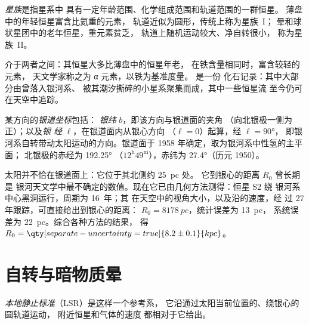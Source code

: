 \begin{definition}[星族]\label{def:b3:milky-way-galaxies:populations}
\emph{星族}是指星系中
具有一定年龄范围、化学组成范围和轨道范围的一群恒星。
薄盘中的年轻恒星富含比氦重的元素，
轨道近似为圆形，传统上称为星族~I；
晕和球状星团中的老年恒星，重元素贫乏，
轨道上随机运动较大、净自转很小，
称为星族~II。
\end{definition}

介于两者之间：其恒星大多比薄盘中的恒星年老，
在铁含量相同时，富含较轻的元素，
天文学家称之为 α 元素，以铁为基准度量。
是一份
化石记录：其中大部分由曾落入银河系、
被其潮汐撕碎的小星系聚集而成，其中一些恒星流
至今仍可在天空中追踪。

\begin{definition}[银道坐标]\label{def:b3:milky-way-galaxies:coordinates}
某方向的\emph{银道坐标}包括：
\emph{银纬} $b$，即该方向与银道面的夹角
（向北银极一侧为正）；以及\emph{银
经} $\ell$，在银道面内从银心方向
（$\ell = 0$）起算，经 $\ell = \ang{90}$，
即银河系自转带动太阳运动的方向。银道面于
1958 年确定，取为银河系中性氢的主平面；
北银极的赤经为 \ang{192.25}
（$12^\mathrm{h}49^\mathrm{m}$），赤纬为 \ang{27.4}（历元
1950）。
\end{definition}

太阳并不恰在银道面上：它位于其北侧约 \qty{25}{pc} 处。
它到银心的距离 $R_0$ 曾长期是
银河天文学中最不确定的数值。现在它已由几何方法测得：恒星 S2 绕
银河系中心黑洞运行，周期为 \num{16}~年；其
在天空中的视角大小，以及沿的速度，经
过 27 年跟踪，可直接给出到银心的距离：
$R_0 = \qty{8178}{pc}$，统计误差为 \qty{13}{pc}，
系统误差为 \qty{22}{pc}。综合各种方法的结果，
得 $R_0 = \qty[separate-uncertainty=true]{8.2 \pm 0.1}{kpc}$。

\section{自转与暗物质晕}\label{sec:b3:milky-way-galaxies:rotation}

\begin{definition}[本地静止标准]\label{def:b3:milky-way-galaxies:lsr}
\emph{本地静止标准}（LSR）是这样一个参考系，
它沿通过太阳当前位置的、绕银心的圆轨道运动，
附近恒星和气体的速度
都相对于它给出。
\end{definition}

